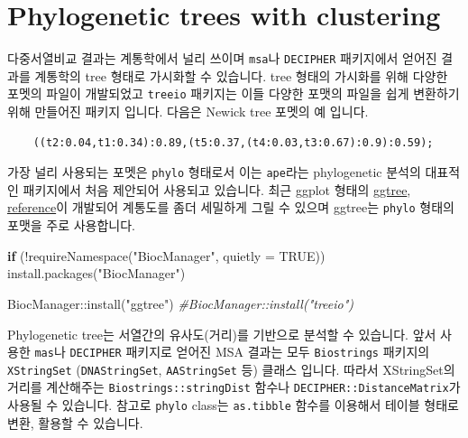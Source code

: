 \documentclass[
]{book}
\newenvironment{Shaded}{\begin{snugshade}}{\end{snugshade}}
\newcommand{\AttributeTok}[1]{\textcolor[rgb]{0.77,0.63,0.00}{#1}}
\newcommand{\CommentTok}[1]{\textcolor[rgb]{0.56,0.35,0.01}{\textit{#1}}}
\newcommand{\ConstantTok}[1]{\textcolor[rgb]{0.00,0.00,0.00}{#1}}
\newcommand{\ControlFlowTok}[1]{\textcolor[rgb]{0.13,0.29,0.53}{\textbf{#1}}}
\newcommand{\FunctionTok}[1]{\textcolor[rgb]{0.00,0.00,0.00}{#1}}
\newcommand{\NormalTok}[1]{#1}
\newcommand{\SpecialCharTok}[1]{\textcolor[rgb]{0.00,0.00,0.00}{#1}}
\newcommand{\StringTok}[1]{\textcolor[rgb]{0.31,0.60,0.02}{#1}}
\begin{document}
\hypertarget{phylogenetic-trees-with-clustering}{%
\section{Phylogenetic trees with clustering}\label{phylogenetic-trees-with-clustering}}

다중서열비교 결과는 계통학에서 널리 쓰이며 \texttt{msa}나 \texttt{DECIPHER} 패키지에서 얻어진 결과를 계통학의 tree 형태로 가시화할 수 있습니다. tree 형태의 가시화를 위해 다양한 포멧의 파일이 개발되었고 \texttt{treeio} 패키지는 이들 다양한 포맷의 파일을 쉽게 변환하기 위해 만들어진 패키지 입니다. 다음은 Newick tree 포멧의 예 입니다.

\begin{verbatim}
    ((t2:0.04,t1:0.34):0.89,(t5:0.37,(t4:0.03,t3:0.67):0.9):0.59); 
\end{verbatim}

가장 널리 사용되는 포멧은 \texttt{phylo} 형태로서 이는 \texttt{ape}라는 phylogenetic 분석의 대표적인 패키지에서 처음 제안되어 사용되고 있습니다. 최근 ggplot 형태의 \href{https://yulab-smu.top/treedata-book/chapter12.html}{ggtree}, \href{https://www.molecularecologist.com/2017/02/08/phylogenetic-trees-in-r-using-ggtree/}{reference}이 개발되어 계통도를 좀더 세밀하게 그릴 수 있으며 ggtree는 \texttt{phylo} 형태의 포맷을 주로 사용합니다.

\begin{Shaded}
\begin{Highlighting}[]
\ControlFlowTok{if}\NormalTok{ (}\SpecialCharTok{!}\FunctionTok{requireNamespace}\NormalTok{(}\StringTok{"BiocManager"}\NormalTok{, }\AttributeTok{quietly =} \ConstantTok{TRUE}\NormalTok{))}
    \FunctionTok{install.packages}\NormalTok{(}\StringTok{"BiocManager"}\NormalTok{)}

\NormalTok{BiocManager}\SpecialCharTok{::}\FunctionTok{install}\NormalTok{(}\StringTok{"ggtree"}\NormalTok{)}
\CommentTok{\#BiocManager::install("treeio")}
\end{Highlighting}
\end{Shaded}

Phylogenetic tree는 서열간의 유사도(거리)를 기반으로 분석할 수 있습니다. 앞서 사용한 \texttt{mas}나 \texttt{DECIPHER} 패키지로 얻어진 MSA 결과는 모두 \texttt{Biostrings} 패키지의 \texttt{XStringSet} (\texttt{DNAStringSet}, \texttt{AAStringSet} 등) 클래스 입니다. 따라서 XStringSet의 거리를 계산해주는 \texttt{Biostrings::stringDist} 함수나 \texttt{DECIPHER::DistanceMatrix}가 사용될 수 있습니다. 참고로 \texttt{phylo} class는 \texttt{as.tibble} 함수를 이용해서 테이블 형태로 변환, 활용할 수 있습니다.
\end{document}
